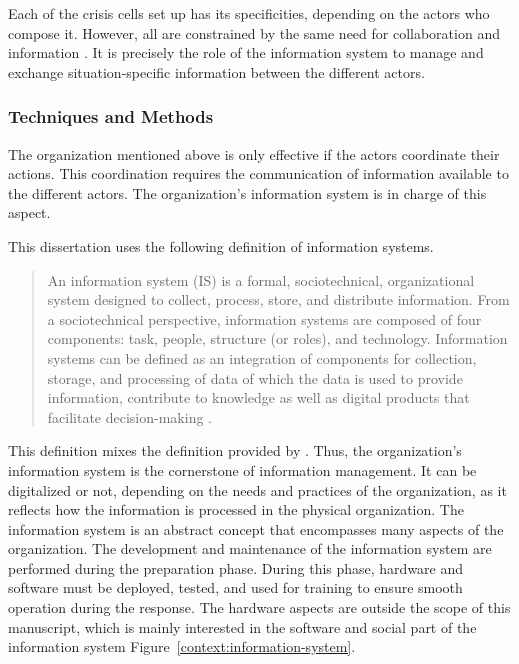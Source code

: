 Each of the crisis cells set up has its specificities, depending on the actors who compose it.
However, all are constrained by the same need for collaboration \parencite{benabenAIFrameworkMetamodel2020,comfortCrisisManagementHindsight2007} and information \parencite{comfortCrisisManagementHindsight2007,endsleyTheorySituationAwareness1995}.
It is precisely the role of the information system to manage and exchange situation-specific information between the different actors.

\subsubsection{Techniques and Methods}
The organization mentioned above is only effective if the actors coordinate their actions.
This coordination requires the communication of information available to the different actors.
The organization's information system is in charge of this aspect.

This dissertation uses the following definition of information systems.
\blockquote{An information system (IS) is a formal, sociotechnical, organizational system designed to collect, process, store, and distribute information.
    From a sociotechnical perspective, information systems are composed of four components: task, people, structure (or roles), and technology.
    Information systems can be defined as an integration of components for collection, storage, and processing of data of which the data is used
    to provide information, contribute to knowledge as well as digital products that facilitate decision-making \parencite{InformationSystem2021}.}
This definition mixes the definition provided by \parencite{oharaManagingThreeLevels1999,piccoliInformationSystemsManagers2019,zwassInformationSystemDefinition}.
Thus, the organization's information system is the cornerstone of information management.
It can be digitalized or not, depending on the needs and practices of the organization, as it reflects how the information is processed in the physical organization.
The information system is an abstract concept that encompasses many aspects of the organization.
The development and maintenance of the information system are performed during the preparation phase.
During this phase, hardware and software must be deployed, tested, and used for training to ensure smooth operation during the response.
The hardware aspects are outside the scope of this manuscript, which is mainly interested in the software and social part of the information system Figure~\ref{context:information-system}.

